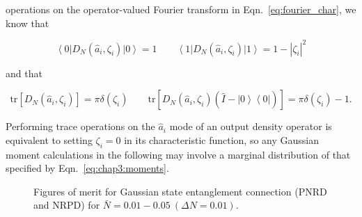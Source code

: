 \documentclass[aps,twocolumn,secnumarabic,amsmath,amssymb,pra,groupedaddress,
showpacs, showkeys]{revtex4-1}
\newcommand{\bra}[1]{\left\langle #1 \right|}
\newcommand{\ket}[1]{\left|#1\right\rangle}
\newcommand{\pna}[1]{\left(#1\right)}
\newcommand{\pnb}[1]{\left[#1\right]}
\newcommand{\eqn}[1]{
\begin{equation}
	#1
\end{equation}
}
\begin{document}
operations on the operator-valued Fourier transform in
Eqn.~\ref{eq:fourier_char}, we know that
\eqn{
\bra{0} D_N\pna{\hat{a}_i,\zeta_i} \ket{0}=1 \qquad  \bra{1}D_N\pna{\hat{a}_i,\zeta_i}\ket{1}=1-|\zeta_i|^2
}
and that
\eqn{
\textrm{tr}\pnb{D_N\pna{\hat{a}_i,\zeta_i}}=\pi\delta\pna{\zeta_i} \qquad \textrm{tr}\pnb{D_N\pna{\hat{a}_i,\zeta_i}\pna{\hat{I}-\ket{0}\bra{0}}}=
\pi\delta\pna{\zeta_i}-1.\label{eq:chap3:trace_id}
}
Performing trace operations on the $\hat{a}_i$ mode of an output density
operator is equivalent to setting $\zeta_i=0$ in its characteristic function,
so any Gaussian moment calculations in the following may involve a marginal
distribution of that specified by Eqn.~\ref{eq:chap3:moments}.

\begin{figure}[tb]
	\centering
	\centering
	\caption{Figures of merit for Gaussian state entanglement connection (PNRD and NRPD) for $\bar{N}=0.01-0.05~\pna{\Delta N=0.01}$. 
	\label{fig:merit:entanglement_connection}}
\end{figure}
\end{document}
